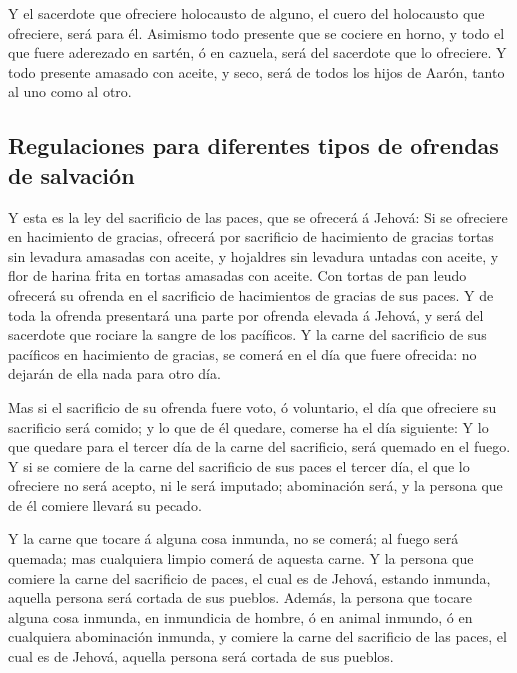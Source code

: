 Y el sacerdote que ofreciere holocausto de alguno, el cuero
del holocausto que ofreciere, será para él.  Asimismo todo
presente que se cociere en horno, y todo el que fuere aderezado en
sartén, ó en cazuela, será del sacerdote que lo ofreciere. 
Y todo presente amasado con aceite, y seco, será de todos los hijos de
Aarón, tanto al uno como al otro.

\hypertarget{regulaciones-para-diferentes-tipos-de-ofrendas-de-salvaciuxf3n}{%
\subsection{Regulaciones para diferentes tipos de ofrendas de
salvación}\label{regulaciones-para-diferentes-tipos-de-ofrendas-de-salvaciuxf3n}}

 Y esta es la ley del sacrificio de las paces, que se
ofrecerá á Jehová:  Si se ofreciere en hacimiento de
gracias, ofrecerá por sacrificio de hacimiento de gracias tortas sin
levadura amasadas con aceite, y hojaldres sin levadura untadas con
aceite, y flor de harina frita en tortas amasadas con aceite.
 Con tortas de pan leudo ofrecerá su ofrenda en el
sacrificio de hacimientos de gracias de sus paces.  Y de
toda la ofrenda presentará una parte por ofrenda elevada á Jehová, y
será del sacerdote que rociare la sangre de los pacíficos. 
Y la carne del sacrificio de sus pacíficos en hacimiento de gracias, se
comerá en el día que fuere ofrecida: no dejarán de ella nada para otro
día.

 Mas si el sacrificio de su ofrenda fuere voto, ó
voluntario, el día que ofreciere su sacrificio será comido; y lo que de
él quedare, comerse ha el día siguiente:  Y lo que quedare
para el tercer día de la carne del sacrificio, será quemado en el fuego.
 Y si se comiere de la carne del sacrificio de sus paces el
tercer día, el que lo ofreciere no será acepto, ni le será imputado;
abominación será, y la persona que de él comiere llevará su pecado.

 Y la carne que tocare á alguna cosa inmunda, no se comerá;
al fuego será quemada; mas cualquiera limpio comerá de aquesta carne.
 Y la persona que comiere la carne del sacrificio de paces,
el cual es de Jehová, estando inmunda, aquella persona será cortada de
sus pueblos.  Además, la persona que tocare alguna cosa
inmunda, en inmundicia de hombre, ó en animal inmundo, ó en cualquiera
abominación inmunda, y comiere la carne del sacrificio de las paces, el
cual es de Jehová, aquella persona será cortada de sus pueblos.

